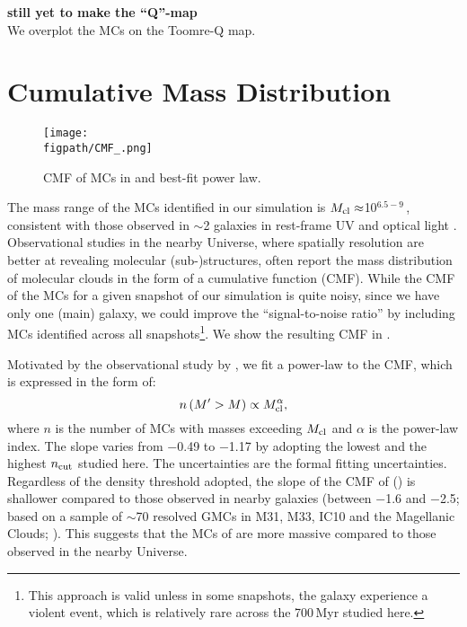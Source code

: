 \documentclass[iop]{emulateapj}
\begin{document}
{\bf still yet to make the ``Q''-map} \\

We overplot the MCs on the Toomre-Q map.






\section{Cumulative Mass Distribution}   \label{sec:cmf}

\begin{figure*}[htbp]
\centering
\texttt{[image: \\figpath/CMF\_.png]}
\caption{
CMF of MCs in \flower and best-fit power law.
\label{fig:cmf}}
\end{figure*}

The mass range of the MCs identified in our simulation is $M_{\rm cl}\approx$10$^{6.5-9}$\,\Msun,
consistent with those observed in \z$\sim$2 galaxies in
rest-frame UV and optical light \citep{Elmegreen07a, Elmegreen09a}.
Observational studies in the nearby Universe, where 
spatially resolution are better at revealing molecular (sub-)structures,
often report the mass distribution of molecular clouds in the form of a cumulative function (CMF).
While the CMF of the MCs for a given snapshot of our simulation is 
quite noisy, since we have only one (main) galaxy, 
we could improve the ``signal-to-noise ratio'' by including 
MCs identified across all snapshots\footnote{This approach is valid unless in some snapshots,
the galaxy experience a violent event, which is relatively rare across the 700\,Myr studied here.}.
We show the resulting CMF in .

Motivated by the observational study by \citealt{Blitz07a}, we fit a power-law to the CMF, which is expressed in the form of:
\begin{equation}
n\left(M^\prime > M\right) \propto M_{\rm cl}^\alpha,
\end{equation}
where $n$ is the number of MCs with masses exceeding $M_{\rm cl}$ and $\alpha$ is the power-law index.
The slope varies from $-$0.49 to $-$1.17 by adopting the lowest and the highest $n_{\rm cut}$ studied here.
The uncertainties are the formal fitting uncertainties.
Regardless of the density threshold adopted, the slope of the CMF of \flower ()
is shallower compared to those observed in nearby galaxies (between $-$1.6 and $-$2.5; based on a sample of
$\sim$70 resolved GMCs in M31, M33, IC10 and the Magellanic Clouds; \citealt{Blitz07a}). %
This suggests that the MCs of \flower are more massive compared to those observed in the nearby Universe.
\end{document}
